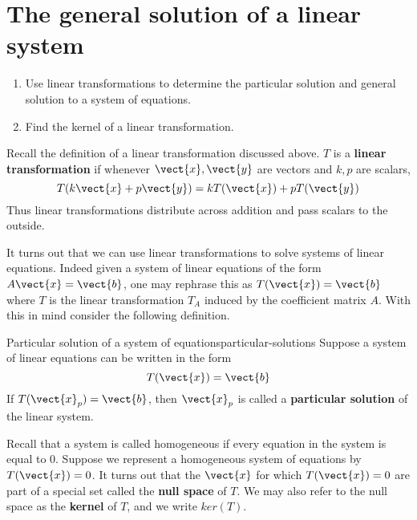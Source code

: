 \section{The general solution of a linear system}

\begin{outcome}
  \begin{enumerate}
  \item Use linear transformations to determine the particular
    solution and general solution to a system of equations.
  \item Find the kernel of a linear transformation.
  \end{enumerate}
\end{outcome}

Recall the definition of a linear transformation discussed above. 
$T$ is a \textbf{linear transformation} if whenever $\vect{x}, \vect{y}$ are
vectors and $k,p$ are scalars,
\begin{equation*}
T(k\vect{x}+p\vect{y}) =k T (\vect{x}) +p T(\vect{y})
\end{equation*}
Thus linear transformations distribute across addition and pass scalars to
the outside.

It turns out that we can use linear transformations to solve
systems of linear equations. Indeed given a system of linear equations of the
form $A\vect{x}=\vect{b}$, one may rephrase this as $T(\vect{x})=\vect{b}$ where $T$ is the linear
transformation $T_A$ induced by the coefficient matrix $A$. With this in mind consider the following definition. 

\begin{definition}{Particular solution of a system of equations}{particular-solutions}
Suppose a system of linear equations can be written in the form
\begin{equation*}
T(\vect{x})=\vect{b}
\end{equation*}
If $T(\vect{x}_{p})=\vect{b}$, 
then $\vect{x}_{p}$ is called a \textbf{particular solution} of
the linear system.
\end{definition}

Recall that a system is called homogeneous if every equation in the system is equal to $0$. 
Suppose we represent a homogeneous system of equations by $T(\vect{x})=0$. It turns out
that the $\vect{x}$ for which $T (\vect{x}) = 0$ are part of a special set called the \textbf{null space}
of $T$. We may also refer to the null space as the \textbf{kernel} of $T$, and we write $ker(T)$. 

